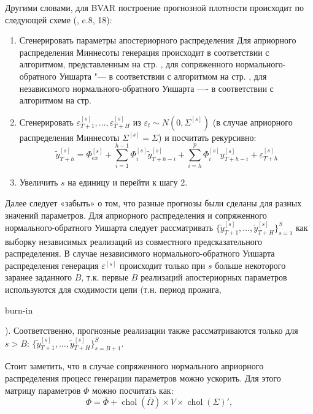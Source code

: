 \documentclass[11pt]{article} %
\DeclareMathOperator{\chol}{chol}
\newcommand{\eng}[1]{\begin{otherlanguage}{english}#1\end{otherlanguage}}
\begin{document}
Другими словами, для BVAR построение прогнозной плотности происходит по следующей схеме (\cite{karlsson_2012}, c.8, 18):
\begin{enumerate}
\item Сгенерировать параметры апостериорного распределения Для априорного распределения Миннесоты генерация происходит в соответствии с алгоритмом, представленным на стр. \pageref{alg:alg1}, для сопряженного нормального-обратного Уишарта  "--- в соответствии с алгоритмом на стр. \pageref{alg:alg2}, для независимого нормального-обратного Уишарта ---- в соответствии с алгоритмом на стр. \pageref{alg:alg3}
\item Сгенерировать $\varepsilon^{[s]}_{T+1},\ldots,\varepsilon^{[s]}_{T+H}$ из $\varepsilon_t\sim N(0,\Sigma^{[s]})$ (в случае априорного распределения Миннесоты $\Sigma^{[s]}=\Sigma$) и посчитать рекурсивно:
\begin{equation}
\tilde y_{T+h}^{[s]}=\Phi_{ex}^{[s]}+\sum_{i=1}^{h-1} \Phi_{i}^{[s]} \tilde y_{T+h-i}^{[s]}+\sum_{i=h}^{p} \Phi_{i}^{[s]} y_{T+h-i}^{[s]} +\varepsilon_{T+h}^{[s]}
\end{equation}
\item Увеличить $s$ на единицу и перейти к шагу 2.
\end{enumerate}
Далее следует «забыть» о том, что разные прогнозы были сделаны для разных значений параметров. Для априорного распределения и сопряженного нормального-обратного Уишарта  следует  рассматривать $\lbrace \tilde y_{T+1}^{[s]},\ldots,\tilde y_{T+H}^{[s]}\rbrace_{s=1}^{S}$ как выборку независимых реализаций из совместного предсказательного распределения. В случае  независимого нормального-обратного Уишарта распределения генерация $\varepsilon^{[s]}$ происходит только при $s$ больше некоторого заранее заданного $B$, т.к. первые $B$ реализаций апостериорных параметров используются для сходимости цепи (т.н. период прожига, \eng{burn-in}). Соответственно,  прогнозные реализации также рассматриваются только для $s>B$: $\lbrace \tilde y_{T+1}^{[s]},\ldots,\tilde y_{T+H}^{[s]}\rbrace_{s=B+1}^{S}$.

Стоит заметить, что в случае сопряженного нормального априорного распределения процесс генерации параметров можно ускорить. Для этого матрицу параметров $\Phi$ можно посчитать как:
\begin{equation}
\Phi=\bar \Phi+\chol (\bar \Omega)\times V\times \chol(\Sigma)',
\end{equation}
\end{document}
